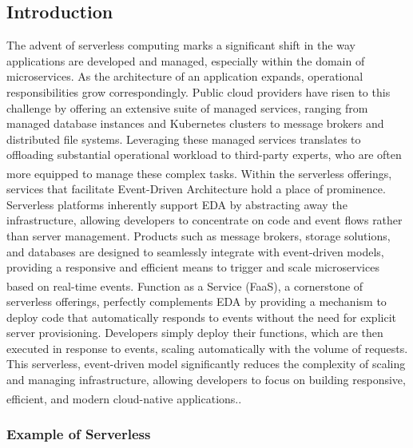 \subsection{Introduction}
The advent of serverless computing marks a significant shift in the way applications are developed
and managed, especially within the domain of microservices. As the architecture of an application
expands, operational responsibilities grow correspondingly. Public cloud providers have risen to
this challenge by offering an extensive suite of managed services, ranging from managed database
instances and Kubernetes clusters to message brokers and distributed file systems. Leveraging these
managed services translates to offloading substantial operational workload to third-party experts,
who are often more equipped to manage these complex tasks\textsuperscript{\cite{microservices_book}}.
\newline\newline
Within the serverless offerings, services that facilitate Event-Driven Architecture hold a
place of prominence. Serverless platforms inherently support EDA by abstracting away the
infrastructure, allowing developers to concentrate on code and event flows rather than server
management. Products such as message brokers, storage solutions, and databases are designed to
seamlessly integrate with event-driven models, providing a responsive and efficient means to trigger
and scale microservices based on real-time events\textsuperscript{\cite{event_book}}.
\newline\newline
Function as a Service (FaaS), a cornerstone of serverless offerings, perfectly complements EDA by
providing a mechanism to deploy code that automatically responds to events without the need for
explicit server provisioning. Developers simply deploy their functions, which are then executed in
response to events, scaling automatically with the volume of requests. This serverless, event-driven
model significantly reduces the complexity of scaling and managing infrastructure, allowing
developers to focus on building responsive, efficient, and modern cloud-native
applications.\textsuperscript{\cite{microservices_book}}.

\subsubsection{Example of Serverless}

